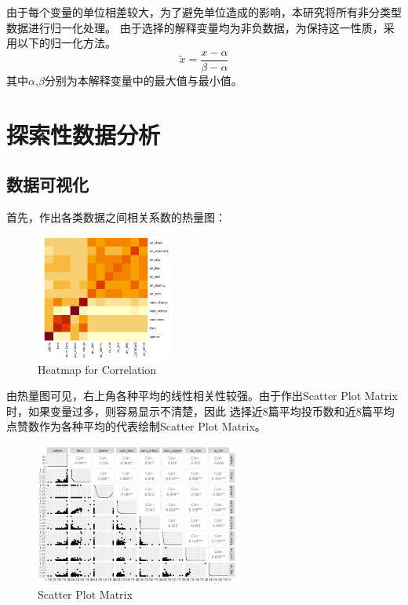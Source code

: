 \documentclass{ctexart}
\begin{document}
由于每个变量的单位相差较大，为了避免单位造成的影响，本研究将所有非分类型数据进行归一化处理。
由于选择的解释变量均为非负数据，为保持这一性质，采用以下的归一化方法。
\begin{equation}
    \tilde{x} = \frac{x-\alpha}{\beta - \alpha}
\end{equation}
其中$\alpha$,$\beta$分别为本解释变量中的最大值与最小值。

\section{探索性数据分析}
\subsection{数据可视化}

首先，作出各类数据之间相关系数的热量图：

\begin{figure}[H]
    \centering
    \includegraphics[width=0.40\textwidth]{EDA/Heatmap.png}
    \caption{Heatmap for Correlation}
\end{figure}

由热量图可见，右上角各种平均的线性相关性较强。由于作出Scatter Plot Matrix时，如果变量过多，则容易显示不清楚，因此
选择近8篇平均投币数和近8篇平均点赞数作为各种平均的代表绘制Scatter Plot Matrix。

\begin{figure}[H]
    \centering
    \includegraphics[width=0.60\textwidth]{EDA/Spm.png}
    \caption{Scatter Plot Matrix}
\end{figure}
\end{document}
